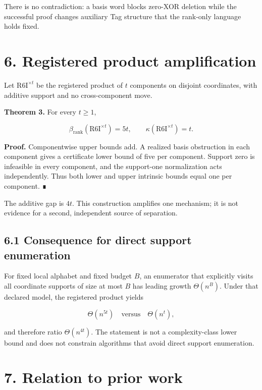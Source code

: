 \documentclass[
  11pt,
]{article}
\begin{document}
There is no contradiction: a basis word blocks zero-XOR deletion while
the successful proof changes auxiliary Tag structure that the rank-only
language holds fixed.

\hypertarget{registered-product-amplification}{%
\section{6. Registered product
amplification}\label{registered-product-amplification}}

Let \(\mathrm{R6I}^{\times t}\) be the registered product of \(t\)
components on disjoint coordinates, with additive support and no
cross-component move.

\textbf{Theorem 3.} For every \(t\ge1\),

\[
\beta_{\mathrm{rank}}(\mathrm{R6I}^{\times t})=5t,
\qquad
\kappa(\mathrm{R6I}^{\times t})=t.
\]

\textbf{Proof.} Componentwise upper bounds add. A realized basis
obstruction in each component gives a certificate lower bound of five
per component. Support zero is infeasible in every component, and the
support-one normalization acts independently. Thus both lower and upper
intrinsic bounds equal one per component. ∎

The additive gap is \(4t\). This construction amplifies one mechanism;
it is not evidence for a second, independent source of separation.

\hypertarget{consequence-for-direct-support-enumeration}{%
\subsection{6.1 Consequence for direct support
enumeration}\label{consequence-for-direct-support-enumeration}}

For fixed local alphabet and fixed budget \(B\), an enumerator that
explicitly visits all coordinate supports of size at most \(B\) has
leading growth \(\Theta(n^B)\). Under that declared model, the
registered product yields

\[
\Theta(n^{5t})\quad\text{versus}\quad\Theta(n^t),
\]

and therefore ratio \(\Theta(n^{4t})\). The statement is not a
complexity-class lower bound and does not constrain algorithms that
avoid direct support enumeration.

\hypertarget{relation-to-prior-work}{%
\section{7. Relation to prior work}\label{relation-to-prior-work}}
\end{document}
